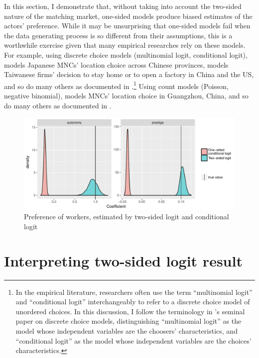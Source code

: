 In this section, I demonstrate that, without taking into account the two-sided
nature of the matching market, one-sided models produce biased estimates of the
actors' preference. While it may be unsurprising that one-sided models fail when
the data generating process is so different from their assumptions, this is a
worthwhile exercise given that many empirical researches rely on these models.
For example, using discrete choice models (multinomial logit, conditional
logit), \citet{Cheng2006} models Japanese MNCs' location
choice across Chinese provinces, \citet{Aw2008} models Taiwanese firms' decision to
stay home or to open a factory in China and the US, and so do many others as
documented in \citet{Arauzo-Carod2010}.\footnote{In the empirical literature,
  researchers often use the term ``multinomial logit'' and ``conditional logit''
interchangeably to refer to a discrete choice model of unordered choices.
In this discussion, I follow the terminology in \citet{McFadden1994}'s seminal paper on discrete
choice models, distinguishing ``multinomial logit'' as the model whose
independent variables are the choosers' characteristics, and ``conditional
logit'' as the model whose independent variables are the choices' characteristics.} Using count models (Poisson, negative
binomial), \citet{Wu1999} models MNCs' location choice in Guangzhou, China, and
so do many others as documented in \citet{Guimaraes2003}. 

\begin{figure}[!ht]
  \centering
  \includegraphics[width=\textwidth,keepaspectratio]{../figure/sim_labor_nojobs_alpha_tsl_vs_cl}
  \caption[Simulation, comparing the two-sided logit's and the
  one-sided conditional logit's estimate.]{Preference of workers, estimated by two-sided logit and conditional logit}
  \label{fig:sim_labor_nojobs_alpha_tsl_vs_col}
\end{figure}

\section{Interpreting two-sided logit result}

